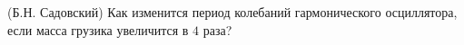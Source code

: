 (Б.Н. Садовский)
Как изменится период колебаний гармонического осциллятора, если масса
грузика увеличится в $4$ раза?
